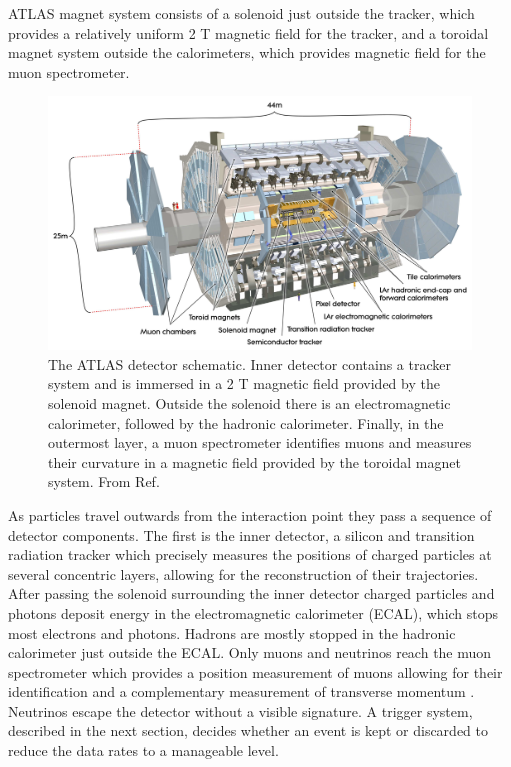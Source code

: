 ATLAS magnet system consists of a solenoid just outside the tracker,
which provides a relatively uniform 2 T magnetic field for the
tracker, and a toroidal magnet system outside the calorimeters, which provides
magnetic field for the muon spectrometer.

\begin{figure}[h]
  \centering
  \includegraphics[width=1\textwidth]{figures/experiment/atlas}
  \caption[The ATLAS detector.]{The ATLAS detector schematic. Inner
  detector contains a tracker system and is immersed in a 2 T magnetic field
  provided by the solenoid magnet. Outside the solenoid there is
  an electromagnetic calorimeter, followed by the hadronic calorimeter.
  Finally, in the outermost layer, a muon spectrometer identifies muons
  and measures their curvature in a magnetic field provided by the
  toroidal magnet system.
  From Ref. \cite{Aad:2008zzm}}
   \label{fig:exp:atlas}
\end{figure}

As particles travel outwards from the interaction point they pass a
sequence of detector components. The first is the inner detector,
a silicon and transition radiation tracker which precisely measures the
positions of charged particles at several concentric layers, allowing for
the reconstruction of their trajectories. After passing the solenoid
surrounding the inner detector charged particles and photons deposit
energy in the electromagnetic calorimeter (ECAL), which stops most electrons
and photons. Hadrons are mostly stopped in the hadronic calorimeter
just outside the ECAL. Only muons and neutrinos reach the muon spectrometer
which provides a position measurement of muons allowing for their
identification and a complementary measurement of transverse momentum
\cite{Aad:2008zzm}. Neutrinos escape the detector without a visible
signature. A trigger system, described in the next section,
decides whether an event is kept or discarded to reduce the data
rates to a manageable level.

